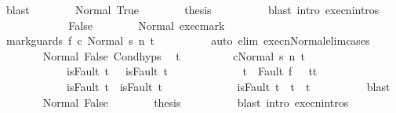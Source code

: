 \begin{isabellebody}
\ blast\isanewline
\ \ \ \ \ \ \isamarkupfalse%
\ Normal\ True\isanewline
\ \ \ \ \ \ \isamarkupfalse%
\ {\isacharquery}thesis\isanewline
\ \ \ \ \ \ \ \ \isamarkupfalse%
\ {\isacharparenleft}blast\ intro{\isacharcolon}\ execn{\isachardot}intros{\isacharparenright}\isanewline
\ \ \ \ \isamarkupfalse%
\isanewline
\ \ \ \ \ \ \isamarkupfalse%
\ False\isanewline
\ \ \ \ \ \ \isamarkupfalse%
\ Normal\ exec{\isacharunderscore}mark\isanewline
\ \ \ \ \ \ \isamarkupfalse%
\ {\isachardoublequoteopen}{\isasymGamma}{\isasymturnstile}{\isasymlangle}mark{\isacharunderscore}guards\ f\ c{}\ {\isacharcomma}Normal\ s{\isacharprime}{\isasymrangle}\ {\isacharequal}n{\isasymRightarrow}\ t{\isachardoublequoteclose}\isanewline
\ \ \ \ \ \ \ \ \isamarkupfalse%
\ {\isacharparenleft}auto\ elim{\isacharcolon}\ execn{\isacharunderscore}Normal{\isacharunderscore}elim{\isacharunderscore}cases{\isacharparenright}\isanewline
\ \ \ \ \ \ \isamarkupfalse%
\ Normal\ False\ Cond{\isachardot}hyps\ \isamarkupfalse%
\ t{\isacharprime}\isanewline
\ \ \ \ \ \ \ \ \ {\isachardoublequoteopen}{\isasymGamma}{\isasymturnstile}{\isasymlangle}c{}{\isacharcomma}Normal\ s{\isacharprime}{\isasymrangle}\ {\isacharequal}n{\isasymRightarrow}\ t{\isacharprime}{\isachardoublequoteclose}\ \isanewline
\ \ \ \ \ \ \ \ \ \ \ \ {\isachardoublequoteopen}isFault\ t\ \ {\isasymlongrightarrow}\ isFault\ t{\isacharprime}{\isachardoublequoteclose}\ \isanewline
\ \ \ \ \ \ \ \ \ \ \ \ {\isachardoublequoteopen}t{\isacharprime}\ {\isacharequal}\ Fault\ f\ \ {\isasymlongrightarrow}\ t{\isacharprime}{\isacharequal}t{\isachardoublequoteclose}\isanewline
\ \ \ \ \ \ \ \ \ \ \ \ {\isachardoublequoteopen}isFault\ t{\isacharprime}\ {\isasymlongrightarrow}\ isFault\ t{\isachardoublequoteclose}\isanewline
\ \ \ \ \ \ \ \ \ \ \ \ {\isachardoublequoteopen}{\isasymnot}\ isFault\ t{\isacharprime}\ {\isasymlongrightarrow}\ t{\isacharprime}\ {\isacharequal}\ t{\isachardoublequoteclose}\isanewline
\ \ \ \ \ \ \ \ \isamarkupfalse%
\ blast\isanewline
\ \ \ \ \ \ \isamarkupfalse%
\ Normal\ False\isanewline
\ \ \ \ \ \ \isamarkupfalse%
\ {\isacharquery}thesis\isanewline
\ \ \ \ \ \ \ \ \isamarkupfalse%
\ {\isacharparenleft}blast\ intro{\isacharcolon}\ execn{\isachardot}intros{\isacharparenright}\isanewline
\ \ \ \ \isamarkupfalse%
\isanewline
\ \ \isamarkupfalse%

\end{isabellebody}
